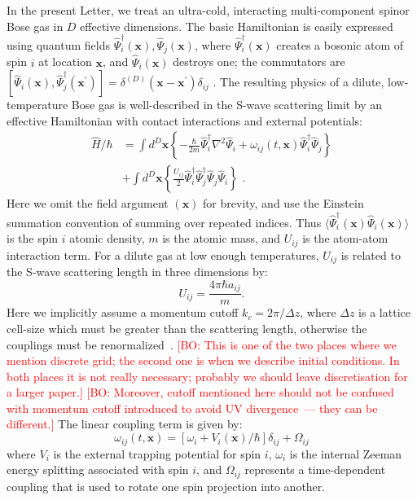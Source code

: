 \documentclass[aps,prl,twocolumn,showpacs,amsmath,amssymb,superscriptaddress]{revtex4-1}
\newcommand{\bogdansremark}[1]{\textcolor{red}{{[}BO: #1{]}}}
\newcommand{\xvec}{\boldsymbol{x}}
\begin{document}
In the present Letter, we treat an ultra-cold,
interacting multi-component spinor Bose gas in $D$ effective dimensions.
The basic Hamiltonian is easily expressed using quantum fields
$\widehat{\Psi}_{i}^{\dagger}(\xvec),\widehat{\Psi}_{j}(\xvec)$,
where $\widehat{\Psi}_{i}^{\dagger}(\xvec)$ creates a bosonic atom of spin $i$
at location $\xvec$, and $\widehat{\Psi}_{i}(\xvec)$ destroys one;
the commutators are
$[\widehat{\Psi}_{i}(\xvec),\widehat{\Psi}_{j}^{\dagger}(\xvec^\prime)] =
\delta^{(D)}(\xvec-\xvec^\prime)\delta_{ij}\,\,.$
The resulting physics of a dilute, low-temperature Bose gas
is well-described in the S-wave scattering limit by an effective Hamiltonian
with contact interactions and external potentials:
\begin{equation}
\begin{split}
	\widehat{H} / \hbar & = \int d^{D}\xvec \left\{
		-\frac{\hbar}{2m} \widehat{\Psi}_{i}^{\dagger} \nabla^2 \widehat{\Psi}_{i} +
		\omega_{ij}(t,\xvec) \widehat{\Psi}_{i}^{\dagger} \widehat{\Psi}_{j}
	\right\} \\
	& + \int d^{D}\xvec \left\{
		\frac{U_{ij}}{2} \widehat{\Psi}_{i}^{\dagger} \widehat{\Psi}_{j}^{\dagger}
		\widehat{\Psi}_{j} \widehat{\Psi}_{i}
	\right\} \,\,.
\end{split}
\end{equation}
Here we omit the field argument $(\xvec)$ for brevity,
and use the Einstein summation convention of summing over repeated indices.
Thus $\langle \widehat{\Psi}_{i}^{\dagger}(\xvec) \widehat{\Psi}_{i}(\xvec) \rangle$
is the spin $i$ atomic density, $m$ is the atomic mass,
and $U_{ij}$ is the atom-atom interaction term.
For a dilute gas at low enough temperatures,
$U_{ij}$ is related to the S-wave scattering length in three dimensions by:
\begin{equation}
	U_{ij}=\frac{4\pi\hbar a_{ij}}{m}.
\end{equation}
Here we implicitly assume a momentum cutoff $k_{c}=2\pi/\Delta z$,
where $\Delta z$ is a lattice cell-size which must be greater than the scattering length,
otherwise the couplings must be renormalized~\cite{Sinatra2002}.
	\bogdansremark{This is one of the two places where we mention discrete grid;
	the second one is when we describe initial conditions.
	In both places it is not really necessary; probably we should leave
	discretisation for a larger paper.}
	\bogdansremark{Moreover, cutoff mentioned here should not be confused with momentum cutoff
	introduced to avoid UV divergence~--- they can be different.}
The linear coupling term is given by:
\begin{equation}
	\omega_{ij}(t,\xvec) = \left[
		\omega_{i} + V_{i}(\xvec) / \hbar
	\right] \delta_{ij} + \Omega_{ij}
\end{equation}
where $V_{i}$ is the external trapping potential for spin $i$,
$\omega_{i}$ is the internal Zeeman energy splitting associated with spin $i$,
and $\Omega_{ij}$ represents a time-dependent coupling
that is used to rotate one spin projection into another.
\end{document}
